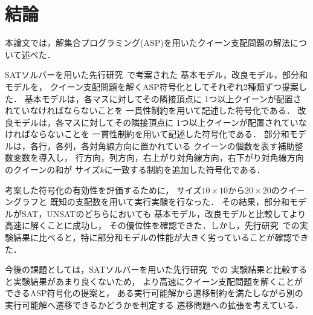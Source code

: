\chapter{結論}\label{chap:conclusion}

本論文では，解集合プログラミング(ASP)を用いたクイーン支配問題の解法について述べた．

SATソルバーを用いた先行研究~\cite{yamamoto21}で考案された
基本モデル，改良モデル，部分和モデルを，
クイーン支配問題を解くASP符号化としてそれぞれ2種類ずつ提案した．
基本モデルは，各マスに対してその隣接頂点に
1つ以上クイーンが配置されていなければならないことを
一貫性制約を用いて記述した符号化である．
改良モデルは，各マスに対してその隣接頂点に
1つ以上クイーンが配置されていなければならないことを
一貫性制約を用いて記述した符号化である．
部分和モデルは，各行，各列，各対角線方向に置かれている
クイーンの個数を表す補助整数変数を導入し，
行方向，列方向，右上がり対角線方向，右下がり対角線方向のクイーンの和が
サイズ$k$に一致する制約を追加した符号化である．

考案した符号化の有効性を評価するために，
サイズ$10 \times 10$から$20 \times 20$のクイーングラフと
既知の支配数を用いて実行実験を行なった．
その結果，部分和モデルがSAT，UNSATのどちらにおいても
基本モデル，改良モデルと比較してより高速に解くことに成功し，
その優位性を確認できた．しかし，先行研究~\cite{yamamoto21}での実験結果に比べると，特に部分和モデルの性能が大きく劣っていることが確認できた．

今後の課題としては，SATソルバーを用いた先行研究~\cite{yamamoto21}での
実験結果と比較すると実験結果があまり良くないため，
より高速にクイーン支配問題を解くことができるASP符号化の提案と，
ある実行可能解から遷移制約を満たしながら別の実行可能解へ遷移できるかどうかを判定する
遷移問題への拡張を考えている．

